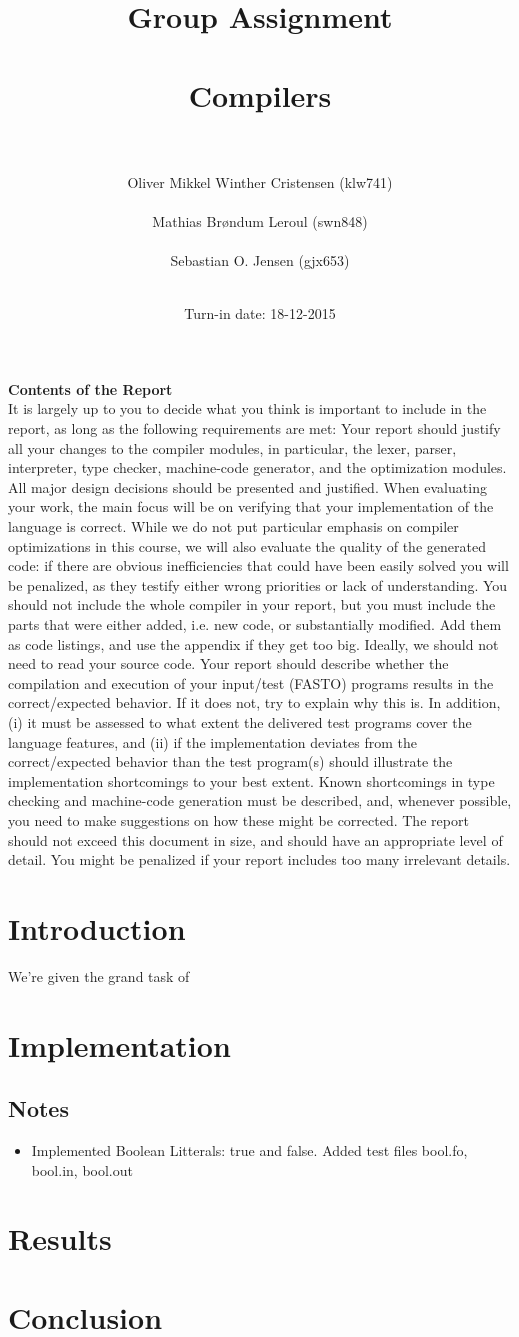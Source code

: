 \documentclass[]{article}
\title{Group Assignment\\ \ \\Compilers\\ \ \\}
\author{Oliver Mikkel Winther Cristensen (klw741) \\ \ \\Mathias Brøndum Leroul (swn848)\\ \ \\Sebastian O. Jensen (gjx653)\\ \ \\}
\date{Turn-in date: 18-12-2015}
\begin{document}
\maketitle
\newpage

\textbf{Contents of the Report}\\
It is largely up to you to decide what you think is important to include in the report, as long as
the following requirements are met:
Your report should justify all your changes to the compiler modules, in particular, the lexer,
parser, interpreter, type checker, machine-code generator, and the optimization modules. All
major design decisions should be presented and justified.
When evaluating your work, the main focus will be on verifying that your implementation
of the language is correct. While we do not put particular emphasis on compiler optimizations
in this course, we will also evaluate the quality of the generated code: if there are obvious
inefficiencies that could have been easily solved you will be penalized, as they testify either
wrong priorities or lack of understanding.
You should not include the whole compiler in your report, but you must include the parts
that were either added, i.e. new code, or substantially modified. Add them as code listings, and
use the appendix if they get too big. Ideally, we should not need to read your source code.
Your report should describe whether the compilation and execution of your input/test (FASTO)
programs results in the correct/expected behavior. If it does not, try to explain why this is. In
addition, (i) it must be assessed to what extent the delivered test programs cover the language
features, and (ii) if the implementation deviates from the correct/expected behavior than the test
program(s) should illustrate the implementation shortcomings to your best extent.
Known shortcomings in type checking and machine-code generation must be described, and,
whenever possible, you need to make suggestions on how these might be corrected.
The report should not exceed this document in size, and should have an appropriate level of
detail. You might be penalized if your report includes too many irrelevant details.

\section{Introduction}
	We're given the grand task of 
\section{Implementation}
	\subsection*{Notes}
		\begin{itemize}
			\item Implemented Boolean Litterals: true and false.
			\subitem Added test files bool.fo, bool.in, bool.out
		\end{itemize}
	
\section{Results}
\section{Conclusion}
\end{document}
